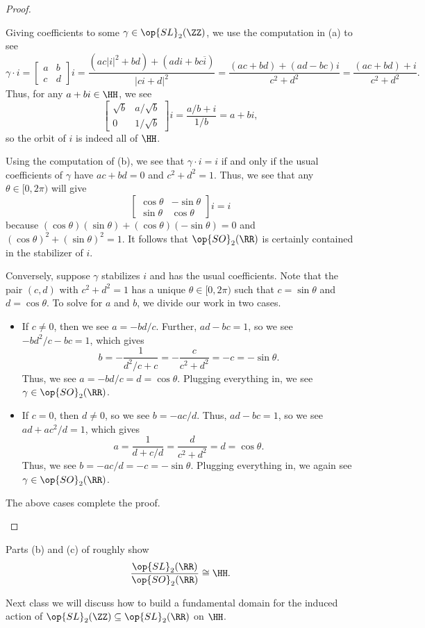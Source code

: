 \documentclass[../notes.tex]{subfiles}
\begin{document}
\begin{proof}
\begin{listalph}
		\item Giving coefficients to some $\gamma\in\op{SL}_2(\ZZ)$, we use the computation in (a) to see
		\[\gamma\cdot i=\begin{bmatrix}
			a & b \\
			c & d
		\end{bmatrix}i=\frac{\left(ac|i|^2+bd\right)+(adi+bc\overline i)}{|ci+d|^2}=\frac{(ac+bd)+(ad-bc)i}{c^2+d^2}=\frac{(ac+bd)+i}{c^2+d^2}.\]
		Thus, for any $a+bi\in\HH$, we see
		\[\begin{bmatrix}
			\sqrt b & a/\sqrt b \\
			0 & 1/\sqrt b
		\end{bmatrix}i=\frac{a/b+i}{1/b}=a+bi,\]
		so the orbit of $i$ is indeed all of $\HH$.

		\item Using the computation of (b), we see that $\gamma\cdot i=i$ if and only if the usual coefficients of $\gamma$ have $ac+bd=0$ and $c^2+d^2=1$. Thus, we see that any $\theta\in[0,2\pi)$ will give
		\[\begin{bmatrix}
			\cos\theta & -\sin\theta \\
			\sin\theta & \cos\theta
		\end{bmatrix}i=i\]
		because $(\cos\theta)(\sin\theta)+(\cos\theta)(-\sin\theta)=0$ and $(\cos\theta)^2+(\sin\theta)^2=1$. It follows that $\op{SO}_2(\RR)$ is certainly contained in the stabilizer of $i$.

		Conversely, suppose $\gamma$ stabilizes $i$ and has the usual coefficients. Note that the pair $(c,d)$ with $c^2+d^2=1$ has a unique $\theta\in[0,2\pi)$ such that $c=\sin\theta$ and $d=\cos\theta$. To solve for $a$ and $b$, we divide our work in two cases.
		\begin{itemize}
			\item If $c\ne0$, then we see $a=-bd/c$. Further, $ad-bc=1$, so we see $-bd^2/c-bc=1$, which gives
			\[b=-\frac1{d^2/c+c}=-\frac c{c^2+d^2}=-c=-\sin\theta.\]
			Thus, we see $a=-bd/c=d=\cos\theta$. Plugging everything in, we see $\gamma\in\op{SO}_2(\RR)$.
			\item If $c=0$, then $d\ne0$, so we see $b=-ac/d$. Thus, $ad-bc=1$, so we see $ad+ac^2/d=1$, which gives
			\[a=\frac1{d+c/d}=\frac d{c^2+d^2}=d=\cos\theta.\]
			Thus, we see $b=-ac/d=-c=-\sin\theta$. Plugging everything in, we again see $\gamma\in\op{SO}_2(\RR)$.
		\end{itemize}
		The above cases complete the proof.
		\qedhere
	\end{listalph}
\end{proof}
\begin{remark}
	Parts (b) and (c) of  roughly show
	\[\frac{\op{SL}_2(\RR)}{\op{SO}_2(\RR)}\cong\HH.\]
\end{remark}
Next class we will discuss how to build a fundamental domain for the induced action of $\op{SL}_2(\ZZ)\subseteq\op{SL}_2(\RR)$ on $\HH$.
\end{document}

